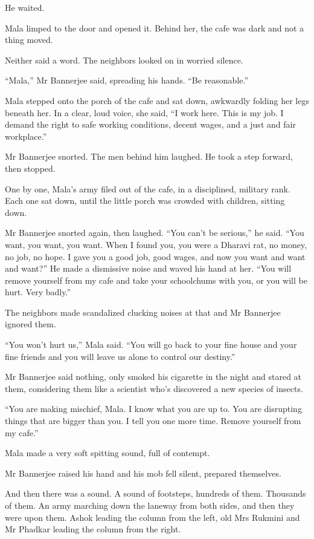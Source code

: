 He waited.

Mala limped to the door and opened it. Behind her, the cafe was
dark and not a thing moved.

Neither said a word. The neighbors looked on in worried silence.

``Mala,'' Mr Bannerjee said, spreading his hands. ``Be reasonable.''

Mala stepped onto the porch of the cafe and sat down, awkwardly
folding her legs beneath her. In a clear, loud voice, she said, ``I
work here. This is my job. I demand the right to safe working
conditions, decent wages, and a just and fair workplace.''

Mr Bannerjee snorted. The men behind him laughed. He took a step
forward, then stopped.

One by one, Mala's army filed out of the cafe, in a disciplined,
military rank. Each one sat down, until the little porch was
crowded with children, sitting down.

Mr Bannerjee snorted again, then laughed. ``You can't be serious,''
he said. ``You want, you want, you want. When I found you, you were
a Dharavi rat, no money, no job, no hope. I gave you a good job,
good wages, and now you want and want and want?'' He made a
dismissive noise and waved his hand at her. ``You will remove
yourself from my cafe and take your schoolchums with you, or you
will be hurt. Very badly.''

The neighbors made scandalized clucking noises at that and Mr
Bannerjee ignored them.

``You won't hurt us,'' Mala said. ``You will go back to your fine
house and your fine friends and you will leave us alone to control
our destiny.''

Mr Bannerjee said nothing, only smoked his cigarette in the night
and stared at them, considering them like a scientist who's
discovered a new species of insects.

``You are making mischief, Mala. I know what you are up to. You are
disrupting things that are bigger than you. I tell you one more
time. Remove yourself from my cafe.''

Mala made a very soft spitting sound, full of contempt.

Mr Bannerjee raised his hand and his mob fell silent, prepared
themselves.

And then there was a sound. A sound of footsteps, hundreds of them.
Thousands of them. An army marching down the laneway from both
sides, and then they were upon them. Ashok leading the column from
the left, old Mrs Rukmini and Mr Phadkar leading the column from
the right.

